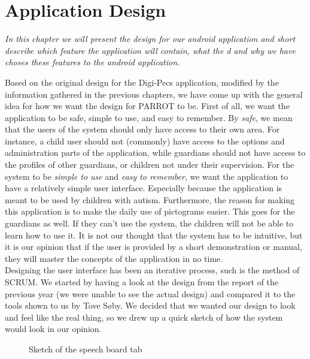 \chapter{Application Design}
\textit{In this chapter we will present the design for our android application and short describe which feature the application will contain, what the d and why we have choses these features to the android application.}

\label{appdes}
Based on the original design for the Digi-Pecs application, modified by the information gathered in the previous chapters, we have come up with the general idea for how we want the design for PARROT to be.\newline
First of all, we want the application to be safe, simple to use, and easy to remember.\newline
By \textit{safe}, we mean that the users of the system should only have access to their own area. For instance, a child user should not (commonly) have access to the options and administration parts of the application, while guardians should not have access to the profiles of other guardians, or children not under their supervision.\newline
For the system to be \textit{simple to use} and \textit{easy to remember}, we want the application to have a relatively simple user interface. Especially because the application is meant to be used by children with autism. Furthermore, the reason for making this application is to make the daily use of pictograms easier. This goes for the guardians as well. If they can't use the system, the children will not be able to learn how to use it.\newline
It is not our thought that the system has to be intuitive, but it is our opinion that if the user is provided by a short demonstration or manual, they will master the concepts of the application in no time.\newline
\\
Designing the user interface has been an iterative process, such is the method of SCRUM. We started by having a look at the design from the report of the previous year (we were unable to see the actual design) and compared it to the tools shown to us by Tove S\o{}by.%
We decided that we wanted our design to look and feel like the real thing, so we drew up a quick sketch of how the system would look in our opinion.\newline
\begin{figure}[htbp]
	\centering
	\caption{Sketch of the speech board tab}
	\label{sketchspeech}
\end{figure}
